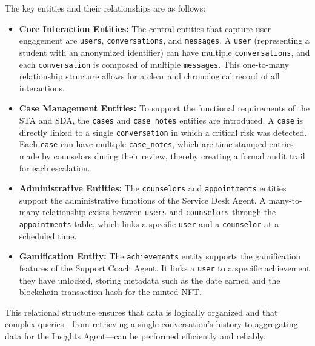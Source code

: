 The key entities and their relationships are as follows:
\begin{itemize}
    \item \textbf{Core Interaction Entities:} The central entities that capture user engagement are \texttt{users}, \texttt{conversations}, and \texttt{messages}. A \texttt{user} (representing a student with an anonymized identifier) can have multiple \texttt{conversations}, and each \texttt{conversation} is composed of multiple \texttt{messages}. This one-to-many relationship structure allows for a clear and chronological record of all interactions.
    \item \textbf{Case Management Entities:} To support the functional requirements of the STA and SDA, the \texttt{cases} and \texttt{case\_notes} entities are introduced. A \texttt{case} is directly linked to a single \texttt{conversation} in which a critical risk was detected. Each \texttt{case} can have multiple \texttt{case\_notes}, which are time-stamped entries made by counselors during their review, thereby creating a formal audit trail for each escalation.
    \item \textbf{Administrative Entities:} The \texttt{counselors} and \texttt{appointments} entities support the administrative functions of the Service Desk Agent. A many-to-many relationship exists between \texttt{users} and \texttt{counselors} through the \texttt{appointments} table, which links a specific \texttt{user} and a \texttt{counselor} at a scheduled time.
    \item \textbf{Gamification Entity:} The \texttt{achievements} entity supports the gamification features of the Support Coach Agent. It links a \texttt{user} to a specific achievement they have unlocked, storing metadata such as the date earned and the blockchain transaction hash for the minted NFT.
\end{itemize}

This relational structure ensures that data is logically organized and that complex queries—from retrieving a single conversation's history to aggregating data for the Insights Agent—can be performed efficiently and reliably.

